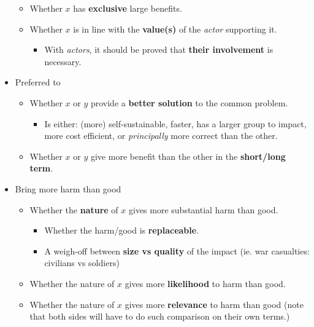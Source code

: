 \begin{itemize}
\begin{itemize}
		\item Whether $x$ has \textbf{exclusive} large benefits.
		\item Whether $x$ is in line with the \textbf{value(s)} of the \textit{actor} supporting it.
		\begin{itemize}
			\item With \textit{actors}, it should be proved that \textbf{their involvement} is necessary.
		\end{itemize}
	\end{itemize}
	\item Preferred to
	\begin{itemize}
		\item Whether $x$ or $y$ provide a \textbf{better solution} to the common problem.
		\begin{itemize}
			 \item Is either: (more) self-sustainable, faster, has a larger group to impact, more cost efficient, or \textit{principally} more correct than the other.
		 \end{itemize} 
		 \item Whether $x$ or $y$ give more benefit than the other in the \textbf{short/long term}.
	\end{itemize}
	\item Bring more harm than good
	\begin{itemize}
		\item Whether the \textbf{nature} of $x$ gives more substantial harm than good.
		\begin{itemize}
			\item Whether the harm/good is \textbf{replaceable}.
			\item A weigh-off between \textbf{size vs quality} of the impact (ie. war casualties: civilians vs soldiers)
		\end{itemize}
		\item Whether the nature of $x$ gives more \textbf{likelihood} to harm than good.
		\item Whether the nature of $x$ gives more \textbf{relevance} to harm than good (note that both sides will have to do such comparison on their own terms.)
	\end{itemize}
\end{itemize}

\vfill
\pagebreak
